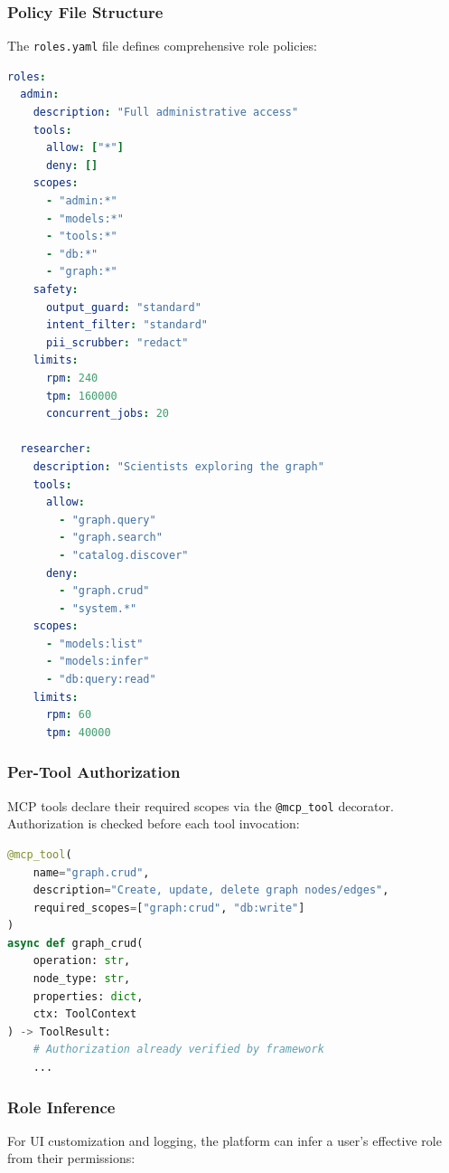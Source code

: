 \subsubsection{Policy File Structure}

The \texttt{roles.yaml} file defines comprehensive role policies:

\begin{lstlisting}[language=yaml,caption={Role policy definition structure}]
roles:
  admin:
    description: "Full administrative access"
    tools:
      allow: ["*"]
      deny: []
    scopes:
      - "admin:*"
      - "models:*"
      - "tools:*"
      - "db:*"
      - "graph:*"
    safety:
      output_guard: "standard"
      intent_filter: "standard"
      pii_scrubber: "redact"
    limits:
      rpm: 240
      tpm: 160000
      concurrent_jobs: 20

  researcher:
    description: "Scientists exploring the graph"
    tools:
      allow:
        - "graph.query"
        - "graph.search"
        - "catalog.discover"
      deny:
        - "graph.crud"
        - "system.*"
    scopes:
      - "models:list"
      - "models:infer"
      - "db:query:read"
    limits:
      rpm: 60
      tpm: 40000
\end{lstlisting}

\subsubsection{Per-Tool Authorization}

MCP tools declare their required scopes via the \texttt{@mcp\_tool} decorator. Authorization is checked before each tool invocation:

\begin{lstlisting}[language=Python,caption={Tool-level authorization declaration}]
@mcp_tool(
    name="graph.crud",
    description="Create, update, delete graph nodes/edges",
    required_scopes=["graph:crud", "db:write"]
)
async def graph_crud(
    operation: str,
    node_type: str,
    properties: dict,
    ctx: ToolContext
) -> ToolResult:
    # Authorization already verified by framework
    ...
\end{lstlisting}

\subsubsection{Role Inference}

For UI customization and logging, the platform can infer a user's effective role from their permissions:

